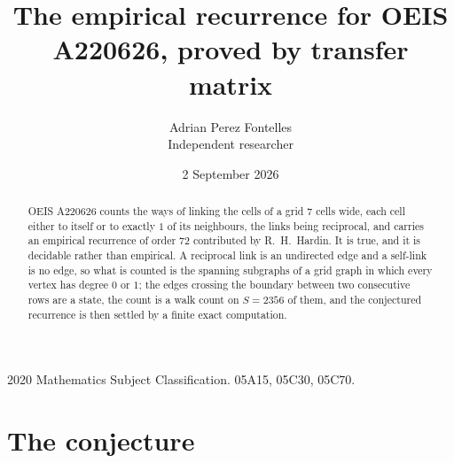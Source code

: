 \documentclass[11pt,a4paper]{article}
\title{The empirical recurrence for OEIS A220626, proved by transfer matrix}
\author{Adrian Perez Fontelles\\ \small Independent researcher}
\date{2 September 2026}
\theoremstyle{plain}
\theoremstyle{definition}
\begin{document}
\maketitle

\begin{abstract}
OEIS A220626 counts the ways of linking the cells of a grid $7$ cells wide, each cell either to
itself or to exactly $1$ of its neighbours, the links being reciprocal, and carries an
empirical recurrence of order $72$ contributed by R.~H.~Hardin. It is true, and it is
decidable rather than empirical. A reciprocal link is an undirected edge and a self-link is
no edge, so what is counted is the spanning subgraphs of a grid graph in which every vertex
has degree $0$ or $1$; the edges crossing the boundary between two consecutive rows are a
state, the count is a walk count on $S=2356$ of them, and the conjectured recurrence is then
settled by a finite exact computation.
\end{abstract}

\noindent\small 2020 Mathematics Subject Classification. 05A15, 05C30, 05C70.\normalsize

\section{The conjecture}
\end{document}

